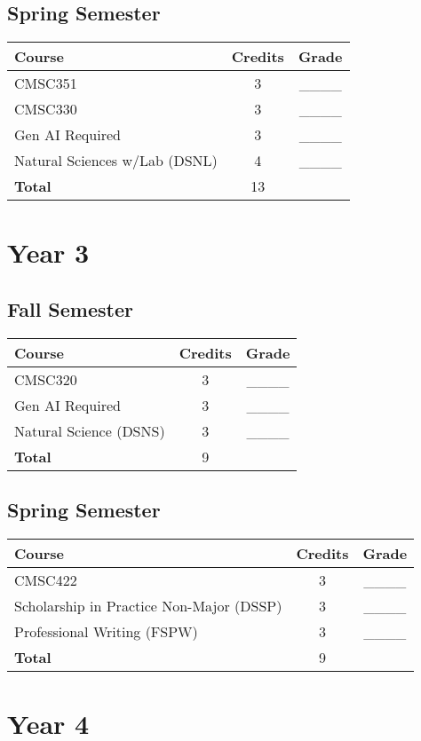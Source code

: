 \subsection*{Spring Semester}
\begin{tabular}{|l|c|c|}
    \hline
    Course & Credits & Grade \\
    \hline
    CMSC351 & 3 & \_\_\_\_ \\
    CMSC330 & 3 & \_\_\_\_ \\
    Gen AI Required & 3 & \_\_\_\_ \\
    Natural Sciences w/Lab (DSNL) & 4 & \_\_\_\_ \\
    \hline
    \textbf{Total} & 13 & \\
    \hline
\end{tabular}

\section*{Year 3}
\subsection*{Fall Semester}
\begin{tabular}{|l|c|c|}
    \hline
    Course & Credits & Grade \\
    \hline
    CMSC320 & 3 & \_\_\_\_ \\
    Gen AI Required & 3 & \_\_\_\_ \\
    Natural Science (DSNS) & 3 & \_\_\_\_ \\
    \hline
    \textbf{Total} & 9 & \\
    \hline
\end{tabular}

\subsection*{Spring Semester}
\begin{tabular}{|l|c|c|}
    \hline
    Course & Credits & Grade \\
    \hline
   CMSC422 & 3 & \_\_\_\_ \\
    Scholarship in Practice Non-Major (DSSP) & 3 & \_\_\_\_ \\
    Professional Writing (FSPW) & 3 & \_\_\_\_ \\
    \hline
    \textbf{Total} & 9 & \\
    \hline
\end{tabular}

\section*{Year 4}

